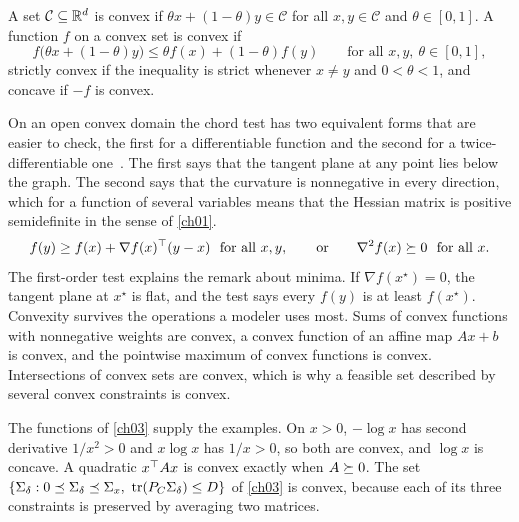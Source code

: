 \begin{definition}\label{def:ch04:convex}
A set $\mathcal C\subseteq\mathbb{R}^d$ is convex if $\theta x+(1-\theta)y\in\mathcal C$ for all $x,y\in\mathcal C$ and $\theta\in[0,1]$. A function $f$ on a convex set is convex if
\begin{equation}\label{eq:ch04:convex}
f\bigl(\theta x+(1-\theta)y\bigr)\le\theta f(x)+(1-\theta)f(y)\qquad\text{for all }x,y,\ \theta\in[0,1],
\end{equation}
strictly convex if the inequality is strict whenever $x\ne y$ and $0<\theta<1$, and concave if $-f$ is convex.
\end{definition}

On an open convex domain the chord test has two equivalent forms that are easier to check, the first for a differentiable function and the second for a twice-differentiable one~\cite{boydvandenberghe2004}. The first says that the tangent plane at any point lies below the graph. The second says that the curvature is nonnegative in every direction, which for a function of several variables means that the Hessian matrix is positive semidefinite in the sense of \cref{ch01}.
\begin{equation}\label{eq:ch04:tests}
f(y)\ge f(x)+\nabla f(x)^{\top}(y-x)\ \ \text{for all }x,y,
\qquad\text{or}\qquad
\nabla^2 f(x)\succeq0\ \ \text{for all }x .
\end{equation}
The first-order test explains the remark about minima. If $\nabla f(x^\star)=0$, the tangent plane at $x^\star$ is flat, and the test says every $f(y)$ is at least $f(x^\star)$. Convexity survives the operations a modeler uses most. Sums of convex functions with nonnegative weights are convex, a convex function of an affine map $Ax+b$ is convex, and the pointwise maximum of convex functions is convex. Intersections of convex sets are convex, which is why a feasible set described by several convex constraints is convex.

The functions of \cref{ch03} supply the examples. On $x>0$, $-\log x$ has second derivative $1/x^2>0$ and $x\log x$ has $1/x>0$, so both are convex, and $\log x$ is concave. A quadratic $x^{\top} Ax$ is convex exactly when $A\succeq0$. The set $\{\Sd:0\preceq\Sd\preceq\Sigma_x,\ \tr(\PC\Sd)\le D\}$ of \cref{ch03} is convex, because each of its three constraints is preserved by averaging two matrices.

